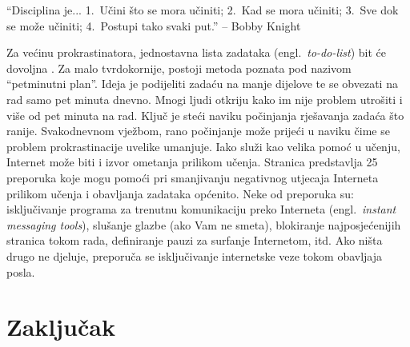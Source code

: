 \documentclass[11pt,twocolumn,english]{article}
\newcommand{\engl}[1]{(engl.~\emph{#1})}
\begin{document}
``Disciplina je... 1.~Učini što se mora učiniti; 2.~Kad se mora učiniti; 3.~Sve
dok se može učiniti; 4.~Postupi tako svaki put.'' -- Bobby Knight  

Za većinu prokrastinatora, jednostavna lista zadataka \engl{to-do-list}
bit će dovoljna \cite{TuckerPsySelfHelp}. Za malo tvrdokornije, postoji metoda
poznata pod nazivom ``petminutni plan''. Ideja je podijeliti zadaću na manje
dijelove te se obvezati na rad samo pet minuta dnevno. Mnogi ljudi otkriju kako
im nije problem utrošiti i više od pet minuta na rad. Ključ je steći naviku
počinjanja rješavanja zadaća što ranije. Svakodnevnom vježbom, rano počinjanje
može prijeći u naviku čime se problem prokrastinacije uvelike umanjuje. Iako
služi kao velika pomoć u učenju, Internet može biti i izvor ometanja prilikom
učenja. Stranica \cite{ColDeg25ways} predstavlja 25 preporuka koje mogu pomoći
pri smanjivanju negativnog utjecaja Interneta prilikom učenja i obavljanja
zadataka općenito. Neke od preporuka su: isključivanje programa za trenutnu
komunikaciju preko Interneta \engl{instant messaging tools}, slušanje
glazbe (ako Vam ne smeta), blokiranje najposjećenijih stranica tokom rada, definiranje
pauzi za surfanje Internetom, itd. Ako ništa drugo ne djeluje, preporuča se
isključivanje internetske veze tokom obavljaja posla.


\section{Zaključak}




\end{document}
